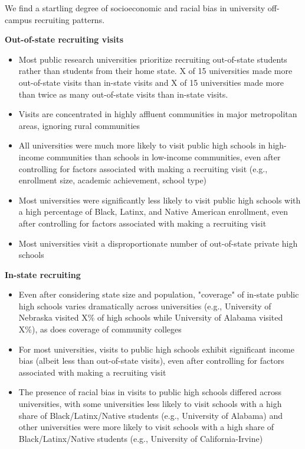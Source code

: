 \documentclass[twoside]{article}
\begin{document}
\begin{color-block}[Findings]

We find a startling degree of socioeconomic and racial bias in university off-campus recruiting patterns.

\textbf{Out-of-state recruiting visits}
\begin{itemize}
    \item Most public research universities prioritize recruiting out-of-state students rather than students from their home state.  X of 15 universities made more out-of-state visits than in-state visits and X of 15 universities made more than twice as many out-of-state visits than in-state visits.
    \item Visits are concentrated in highly affluent communities in major metropolitan areas, ignoring rural communities
    \item All universities were much more likely to visit public high schools in high-income communities than schools in low-income communities, even after controlling for factors associated with making a recruiting visit (e.g., enrollment size, academic achievement, school type)
    \item Most universities were significantly less likely to visit public high schools with a high percentage of Black, Latinx, and Native American enrollment, even after controlling for factors associated with making a recruiting visit
    \item Most universities visit a disproportionate number of out-of-state private high schools
\end{itemize}

\textbf{In-state recruiting}
\begin{itemize}
    \item Even after considering state size and population, "coverage" of in-state public high schools varies dramatically across universities (e.g., University of Nebraska visited X\% of high schools while University of Alabama visited X\%), as does coverage of community colleges
    \item For most universities, visits to public high schools exhibit significant income bias (albeit less than out-of-state visits), even after controlling for factors associated with making a recruiting visit
    \item The presence of racial bias in visits to public high schools differed across universities, with some universities less likely to visit schools with a high share of Black/Latinx/Native students (e.g., University of Alabama) and other universities were more likely to visit schools with a high share of Black/Latinx/Native students (e.g., University of California-Irvine)
\end{itemize}  


\end{color-block}
\end{document}
